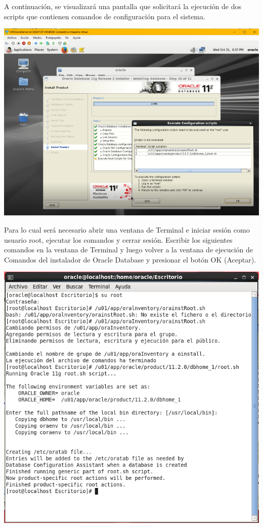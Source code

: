 \vspace{\baselineskip}

A continuación, se visualizará una pantalla que solicitará la ejecución de dos scripts que contienen comandos de configuración para el sistema.
\begin{center}
	\includegraphics[width=16cm]{./Imagenes/85} 
\end{center}

\vspace{\baselineskip}

Para lo cual será necesario abrir una ventana de Terminal e iniciar sesión como usuario root, ejecutar los comandos y cerrar sesión. Escribir los siguientes comandos en la ventana de Terminal y luego volver a la ventana de ejecución de Comandos del instalador de Oracle Database y presionar el botón OK (Aceptar).
\begin{center}
	\includegraphics[width=16cm]{./Imagenes/86} 
\end{center}

